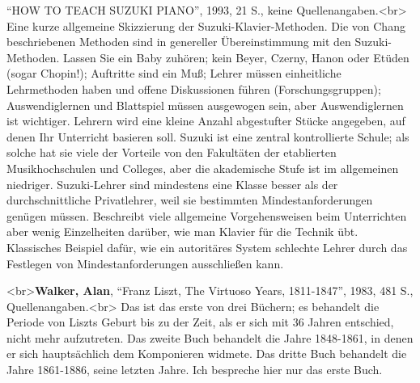 \enquote{HOW TO TEACH SUZUKI PIANO}, 1993, 21 S., keine Quellenangaben.<br>  Eine kurze allgemeine Skizzierung der Suzuki-Klavier-Methoden.
Die von Chang beschriebenen Methoden sind in genereller Übereinstimmung mit den Suzuki-Methoden.
Lassen Sie ein Baby zuhören; kein Beyer, Czerny, Hanon oder Etüden (sogar Chopin!); Auftritte sind ein Muß; Lehrer müssen einheitliche Lehrmethoden haben und offene Diskussionen führen (Forschungsgruppen); Auswendiglernen und Blattspiel müssen ausgewogen sein, aber Auswendiglernen ist wichtiger.
Lehrern wird eine kleine Anzahl abgestufter Stücke angegeben, auf denen Ihr Unterricht basieren soll.
Suzuki ist eine zentral kontrollierte Schule; als solche hat sie viele der Vorteile von den Fakultäten der etablierten Musikhochschulen und Colleges, aber die akademische Stufe ist im allgemeinen niedriger.
Suzuki-Lehrer sind mindestens eine Klasse besser als der durchschnittliche Privatlehrer, weil sie bestimmten Mindestanforderungen genügen müssen.
Beschreibt viele allgemeine Vorgehensweisen beim Unterrichten aber wenig Einzelheiten darüber, wie man Klavier für die Technik übt.
Klassisches Beispiel dafür, wie ein autoritäres System schlechte Lehrer durch das Festlegen von Mindestanforderungen ausschließen kann.


\hypertarget{Walker}{}

<br>\textbf{Walker, Alan}, \enquote{Franz Liszt, The Virtuoso Years, 1811-1847}, 1983, 481 S., Quellenangaben.<br>
Das ist das erste von drei Büchern; es behandelt die Periode von Liszts Geburt bis zu der Zeit, als er sich mit 36 Jahren entschied, nicht mehr aufzutreten.
Das zweite Buch behandelt die Jahre 1848-1861, in denen er sich hauptsächlich dem Komponieren widmete.
Das dritte Buch behandelt die Jahre 1861-1886, seine letzten Jahre.
Ich bespreche hier nur das erste Buch.

